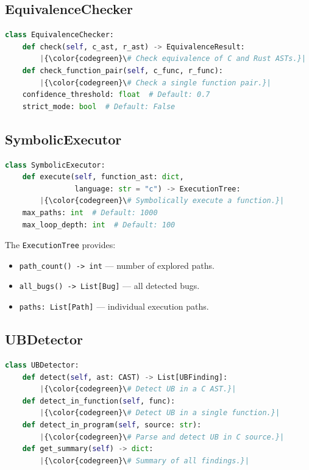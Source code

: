 \documentclass[11pt,a4paper]{article}
\begin{document}
\begin{appendices}
\subsection{EquivalenceChecker}

\begin{lstlisting}[language=Python,escapechar=|]
class EquivalenceChecker:
    def check(self, c_ast, r_ast) -> EquivalenceResult:
        |{\color{codegreen}\# Check equivalence of C and Rust ASTs.}|
    def check_function_pair(self, c_func, r_func):
        |{\color{codegreen}\# Check a single function pair.}|
    confidence_threshold: float  # Default: 0.7
    strict_mode: bool  # Default: False
\end{lstlisting}

\subsection{SymbolicExecutor}

\begin{lstlisting}[language=Python,escapechar=|]
class SymbolicExecutor:
    def execute(self, function_ast: dict,
                language: str = "c") -> ExecutionTree:
        |{\color{codegreen}\# Symbolically execute a function.}|
    max_paths: int  # Default: 1000
    max_loop_depth: int  # Default: 100
\end{lstlisting}

The \texttt{ExecutionTree} provides:
\begin{itemize}
  \item \texttt{path\_count() -> int} --- number of explored paths.
  \item \texttt{all\_bugs() -> List[Bug]} --- all detected bugs.
  \item \texttt{paths: List[Path]} --- individual execution paths.
\end{itemize}

\subsection{UBDetector}

\begin{lstlisting}[language=Python,escapechar=|]
class UBDetector:
    def detect(self, ast: CAST) -> List[UBFinding]:
        |{\color{codegreen}\# Detect UB in a C AST.}|
    def detect_in_function(self, func):
        |{\color{codegreen}\# Detect UB in a single function.}|
    def detect_in_program(self, source: str):
        |{\color{codegreen}\# Parse and detect UB in C source.}|
    def get_summary(self) -> dict:
        |{\color{codegreen}\# Summary of all findings.}|
\end{lstlisting}


\end{appendices}
\end{document}

